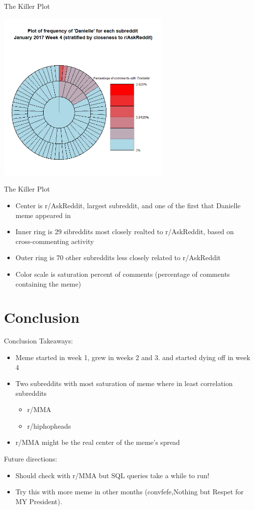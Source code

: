 \documentclass{beamer}
\begin{document}
\begin{frame}{The Killer Plot}
\begin{center}
\includegraphics[width=8.5cm,scale=1]{Plots/2017_jan_week4}
\end{center}
\end{frame}

\begin{frame}{The Killer Plot}
\begin{itemize}
	\item Center is r/AskReddit, largest subreddit, and one of the first that Danielle meme appeared in
	\item Inner ring is 29 sibreddits most closely realted to r/AskReddit, based on cross-commenting activity
	\item Outer ring is 70 other subreddits less closely related to r/AskReddit
	\item Color scale is saturation percent of comments (percentage of comments containing the meme)
\end{itemize}
\end{frame}

\section{Conclusion}
\begin{frame}{Conclusion}
Takeaways:
\begin{itemize}
	\item Meme started in week 1, grew in weeks 2 and 3. and started dying off in week 4
	\item Two subreddits with most saturation of meme where in least correlation subreddits
	\begin{itemize}
		\item r/MMA
		\item r/hiphopheads
	\end{itemize}
	\item r/MMA might be the real center of the meme's spread
\end{itemize}
Future directions:
\begin{itemize}
	\item Should check with r/MMA but SQL queries take a while to run!
	\item Try this with more meme in other months (convfefe,Nothing but Respet for MY President).
\end{itemize}

\end{frame}
\end{document}
